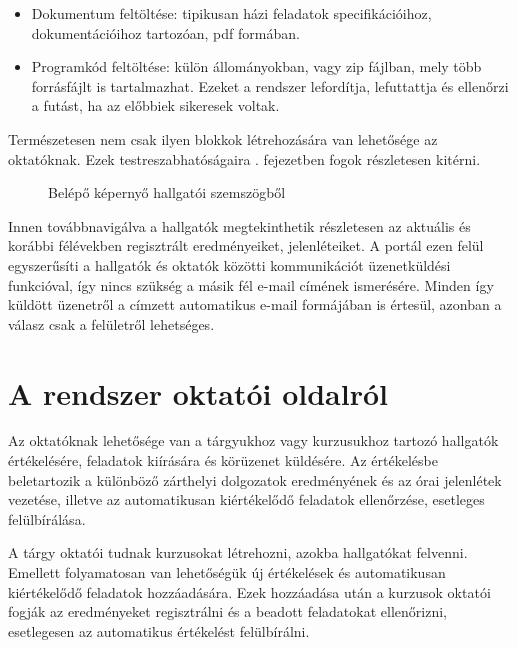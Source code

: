     \begin{itemize}
        \item Dokumentum feltöltése: tipikusan házi feladatok specifikációihoz, dokumentációihoz tartozóan, pdf formában.
        \item Programkód feltöltése: külön állományokban, vagy zip fájlban, mely több forrásfájlt is tartalmazhat. Ezeket a rendszer lefordítja, lefuttattja és ellenőrzi a futást, ha az előbbiek sikeresek voltak.
    \end{itemize}

    Természetesen nem csak ilyen blokkok létrehozására van lehetősége az oktatóknak. Ezek testreszabhatóságaira . fejezetben fogok részletesen kitérni.
    
    \begin{figure}[h]
        \centering
        \caption{Belépő képernyő hallgatói szemszögből}
        \label{fig:jporta_home}
    \end{figure}

    Innen továbbnavigálva a hallgatók megtekinthetik részletesen az aktuális és korábbi félévekben regisztrált eredményeiket, jelenléteiket. A portál ezen felül egyszerűsíti a hallgatók és oktatók közötti kommunikációt üzenetküldési funkcióval, így nincs szükség a másik fél e-mail címének ismerésére. Minden így küldött üzenetről a címzett automatikus e-mail formájában is értesül, azonban a válasz csak a felületről lehetséges.
 
\section{A rendszer oktatói oldalról}\label{section:teacher}
    Az oktatóknak lehetősége van a tárgyukhoz vagy kurzusukhoz tartozó hallgatók értékelésére, feladatok kiírására és körüzenet küldésére. Az értékelésbe beletartozik a különböző zárthelyi dolgozatok eredményének és az órai jelenlétek vezetése, illetve az automatikusan kiértékelődő feladatok ellenőrzése, esetleges felülbírálása.

    A tárgy oktatói tudnak kurzusokat létrehozni, azokba hallgatókat felvenni. Emellett folyamatosan van lehetőségük új értékelések és automatikusan kiértékelődő feladatok hozzáadására. Ezek hozzáadása után a kurzusok oktatói fogják az eredményeket regisztrálni és a beadott feladatokat ellenőrizni, esetlegesen az automatikus értékelést felülbírálni.

